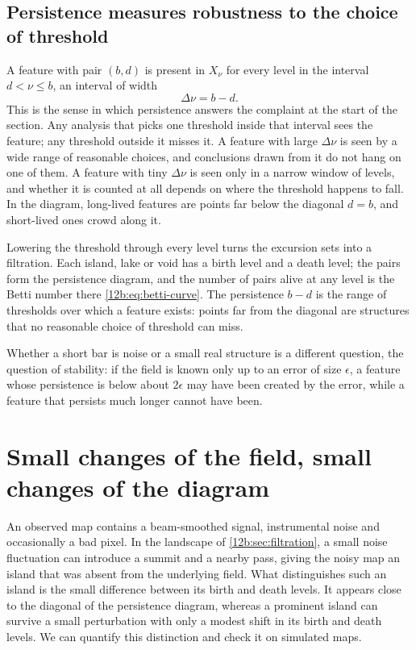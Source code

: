 \subsection{Persistence measures robustness to the choice of threshold}
\label{12b:sec:robust}

A feature with pair $(b,d)$ is present in $X_\nu$ for every level in the interval $d<\nu\leq b$, an interval of
width
\begin{equation}
  \Delta\nu=b-d .
  \label{12b:eq:persistence}
\end{equation}
This is the sense in which persistence answers the complaint at the start of the section. Any analysis that
picks one threshold inside that interval sees the feature; any threshold outside it misses it. A feature with
large $\Delta\nu$ is seen by a wide range of reasonable choices, and conclusions drawn from it do not hang on
one of them. A feature with tiny $\Delta\nu$ is seen only in a narrow window of levels, and whether it is
counted at all depends on where the threshold happens to fall. In the diagram, long-lived features are points
far below the diagonal $d=b$, and short-lived ones crowd along it.

\begin{keyidea}[Persistence]
Lowering the threshold through every level turns the excursion sets into a filtration. Each island, lake or
void has a birth level and a death level; the pairs form the persistence diagram, and the number of pairs alive
at any level is the Betti number there \eqref{12b:eq:betti-curve}. The persistence $b-d$ is the range of
thresholds over which a feature exists: points far from the diagonal are structures that no reasonable choice
of threshold can miss.
\end{keyidea}

Whether a short bar is noise or a small real structure is a different question, the question of stability:
if the field is known only up to an error of size $\epsilon$, a feature whose persistence is below about
$2\epsilon$ may have been created by the error, while a feature that persists much longer cannot have been.
\section{Small changes of the field, small changes of the diagram}
\label{12b:sec:stability}

An observed map contains a beam-smoothed signal, instrumental noise and
occasionally a bad pixel. In the landscape of \cref{12b:sec:filtration}, a small
noise fluctuation can introduce a summit and a nearby pass, giving the noisy
map an island that was absent from the underlying field. What distinguishes
such an island is the small difference between its birth and death levels.
It appears close to the diagonal of the persistence diagram, whereas a
prominent island can survive a small perturbation with only a modest shift
in its birth and death levels. We can quantify this distinction and check it
on simulated maps.

